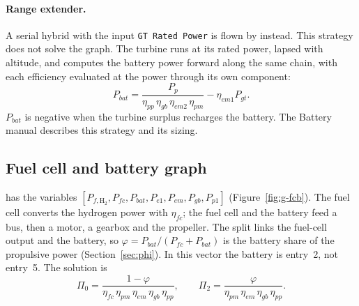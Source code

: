\documentclass[a4paper,11pt]{article}
\begin{document}
\paragraph{Range extender.} A serial hybrid with the input \texttt{GT Rated Power} is flown by
 instead. This strategy does not solve the
graph. The turbine runs at its rated power, lapsed with altitude, and
 computes the battery power forward along the same chain,
with each efficiency evaluated at the power through its own component:
\begin{equation}
  P_{bat} = \frac{P_p}{\eta_{pp}\,\eta_{gb}\,\eta_{em2}\,\eta_{pm}} - \eta_{em1}P_{gt} .
\end{equation}
$P_{bat}$ is negative when the turbine surplus recharges the battery. The Battery manual
describes this strategy and its sizing.

\subsection{Fuel cell and battery graph}\label{sec:fcb-graph}
 has
the variables $[P_{f,\mathrm{H_2}}, P_{fc}, P_{bat}, P_{e1}, P_{em}, P_{gb}, P_{p1}]$
(Figure~\ref{fig:g-fcb}). The fuel cell converts the hydrogen power with $\eta_{fc}$; the
fuel cell and the battery feed a bus, then a motor, a gearbox and the propeller. The split
links the fuel-cell output and the battery, so $\varphi = P_{bat}/(P_{fc} + P_{bat})$ is the
battery share of the propulsive power (Section~\ref{sec:phi}). In this vector the battery is
entry~2, not entry~5. The solution is
\begin{equation}
  \Pi_0 = \frac{1-\varphi}{\eta_{fc}\,\eta_{pm}\,\eta_{em}\,\eta_{gb}\,\eta_{pp}},\qquad
  \Pi_2 = \frac{\varphi}{\eta_{pm}\,\eta_{em}\,\eta_{gb}\,\eta_{pp}} .
  \label{eq:fcb}
\end{equation}
\end{document}
